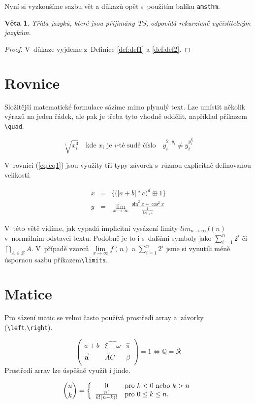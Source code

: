 \documentclass[11pt, a4paper,twocolumn]{article}
\newtheorem{theorem}{Věta}
\begin{document}
Nyní si vyzkoušíme sazbu vět a důkazů opět s~použitím balíku \texttt{amsthm}.

\begin{theorem}
Třída jazyků, které jsou přijímány TS, odpovídá \textnormal{rekurzivně vyčíslitelným jazykům.}
\end{theorem}

\begin{proof}
V~důkaze vyjdeme z~Definice \ref{def:def1} a \ref{def:def2}.
\end{proof}

\section{Rovnice}
Složitější matematické formulace sázíme mimo plynulý text. Lze umístit několik výrazů na jeden řádek, ale pak je třeba tyto vhodně oddělit, například příkazem \verb|\quad|.

$$
\sqrt[i]{x_i^{3}}
   \quad \text{kde $x_i$ je $i$-té sudé číslo} \quad 
y_i^{2\cdot y_i} \neq y_i^{y_i^{y_i}}
$$

V~rovnici (\ref{eq:eq1}) jsou využity tři typy závorek s~různou explicitně definovanou velikostí.

\begin{eqnarray} 
x & = & \Bigg\{ \bigg( \big[a+b\big]\ast c \bigg)^d \oplus 1 \Bigg\} \label{eq:eq1} \\ 
y & = & \lim_{x \to \infty}\frac{\sin^2 x + \cos^2 x}{\frac{1}{\log_{10} x}} \label{eq:eq2}
\end{eqnarray}

V~této větě vidíme, jak vypadá implicitní vysázení limity $lim_{n \to \infty} f(n)$ v~normálním odstavci textu. Podobně je to i s~dalšími symboly jako $\sum_{i=1}^n 2^i$ či $\bigcap_{A \in \mathcal{B}} A$. V~případě vzorců $\lim\limits_{x \to \infty} f(n)$ a $\sum\limits_{i=1}^{n}2^i$ jsme si vynutili méně úspornou sazbu příkazem\verb|\limits|.

\section{Matice}
Pro sázení matic se velmi často používá prostředí array a~závorky (\verb|\left|,\verb|\right|).

$$
\left( 
\begin{array}{ccc} 
    a+b & \widehat{\xi+\omega} & \hat{\pi} \\
    \vec{\mathbf{a}} & \overleftrightarrow{AC} & \beta \\
\end{array} \right)
= 1 \Longleftrightarrow \mathbb{Q} = \mathcal{R}
$$
Prostředí array lze úspěšně využít i jinde.

$$
\binom{n}{k} = \left\{
\begin{array}{c l}
    0 & \text{pro } k < 0 \text{ nebo } k >n \\
    \frac{n!}{k!(n-k)!} & \text{pro } 0 \leq k \leq n.
\end{array}
\right.
$$
\end{document}
